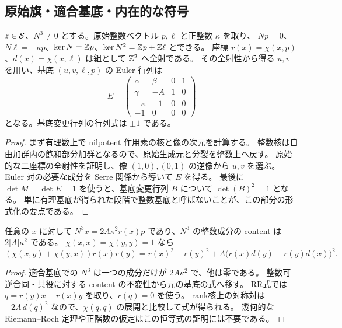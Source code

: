 \subsection{原始旗・適合基底・内在的な符号}
\begin{theorem}[正則解の原始整数旗と適合基底]\label{bp:intrinsic-frame}
\leanok
{}
$z\in\mathcal S$、$N^3\ne0$ とする。原始整数ベクトル $p,\ell$ と正整数 $\kappa$ を取り、
$Np=0$、$N\ell=-\kappa p$、$\ker N=\mathbb Z p$、$\ker N^2=\mathbb Z p+\mathbb Z\ell$ とできる。
座標 $r(x)=\chi(x,p)$、$d(x)=\chi(x,\ell)$ は組として $\mathbb Z^2$ へ全射である。
その全射性から得る $u,v$ を用い、基底 $(u,v,\ell,p)$ の Euler 行列は
\[
E=\begin{pmatrix}
\alpha&\beta&0&1\\
\gamma&-A&1&0\\
-\kappa&-1&0&0\\
-1&0&0&0
\end{pmatrix}
\]
となる。基底変更行列の行列式は $\pm1$ である。
\end{theorem}
\begin{proof}\leanok{}
まず有理数上で nilpotent 作用素の核と像の次元を計算する。
整数核は自由加群内の飽和部分加群となるので、原始生成元と分裂を整数上へ戻す。
原始的な二座標の全射性を証明し、像 $(1,0),(0,1)$ の逆像から $u,v$ を選ぶ。
Euler 対の必要な成分を Serre 関係から導いて $E$ を得る。
最後に $\det M=\det E=1$ を使うと、基底変更行列 $B$ について $\det(B)^2=1$ となる。
単に有理基底が得られた段階で整数基底と呼ばないことが、この部分の形式化の要点である。
\end{proof}

\begin{proposition}\label{bp:intrinsic-formula}
\leanok
{}
任意の $x$ に対して $N^3x=2A\kappa^2r(x)p$ であり、$N^3$ の整数成分の content は $2|A|\kappa^2$ である。
$\chi(x,x)=\chi(y,y)=1$ なら
\[
(\chi(x,y)+\chi(y,x))r(x)r(y)
=r(x)^2+r(y)^2+A\bigl(r(x)d(y)-r(y)d(x)\bigr)^2.
\]
\end{proposition}
\begin{proof}\leanok{}
適合基底での $N^3$ は一つの成分だけが $2A\kappa^2$ で、他は零である。
整数可逆合同・共役に対する content の不変性から元の基底の式へ移す。
RR式では $q=r(y)x-r(x)y$ を取り、$r(q)=0$ を使う。
rank核上の対称対は $-2A\,d(q)^2$ なので、$\chi(q,q)$ の展開と比較して式が得られる。
幾何的な Riemann--Roch 定理や正階数の仮定はこの恒等式の証明には不要である。
\end{proof}

